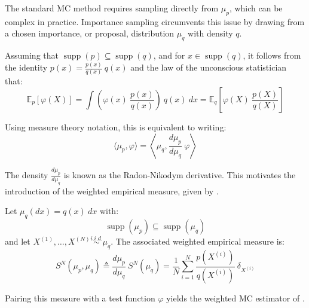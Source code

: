 The standard MC method requires sampling directly from $\mu_p$, which can be complex in practice. Importance sampling \cite{bib:importance-sampling} circumvents this issue by drawing from a chosen importance, or proposal, distribution $\mu_q$ with density $q$.

Assuming that $\operatorname{supp}(p)\subseteq\operatorname{supp}(q)$, and for $x\in\operatorname{supp}(q)$, it follows from the identity $p(x)=\frac{p(x)}{q(x)}\:q(x)$ and the law of the unconscious statistician that:
\begin{equation}
	\mathbb{E}_p[\varphi(X)]=\int{\left(\varphi(x)\:\frac{p(x)}{q(x)}\right)\:q(x)\:dx}=\mathbb{E}_q\left[\varphi(X)\:\frac{p(X)}{q(X)}\right]
\end{equation}

Using measure theory notation, this is equivalent to writing:
\begin{equation}
	\langle\mu_p,\varphi\rangle=\left\langle\mu_q,\frac{d\mu_p}{d\mu_q}\:\varphi\right\rangle
\end{equation}

The density $\frac{d\mu_p}{d\mu_q}$ is known as the Radon-Nikodym derivative. This motivates the introduction of the weighted empirical measure, given by .

\begin{definition}\label{th:weighted_empirical}
	Let $\mu_q(dx)=q(x)\:dx$ with:
	\begin{equation}
		\operatorname{supp}(\mu_p)\subseteq\operatorname{supp}(\mu_q)
	\end{equation}
	and let $X^{(1)},\dots,X^{(N)}\overset{i.i.d.}{\sim}\mu_q$. The associated weighted empirical measure is:
	\begin{equation}
		S^N(\mu_p,\mu_q)\triangleq\frac{d\mu_p}{d\mu_q}\:S^N(\mu_q)=\frac{1}{N}\sum_{i=1}^N\frac{p(X^{(i)})}{q(X^{(i)})}\:\delta_{X^{(i)}}
	\end{equation}
\end{definition}

Pairing this measure with a test function $\varphi$ yields the weighted MC estimator of .

